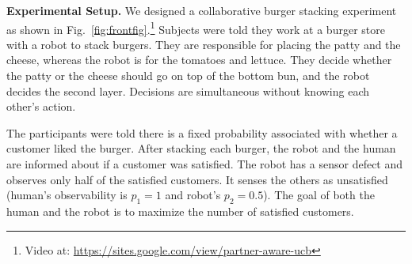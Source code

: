 \documentclass[letterpaper]{article} %
\theoremstyle{definition}
\begin{document}



\smallskip
\noindent\textbf{Experimental Setup.} We designed a collaborative burger stacking experiment as shown in Fig.~\ref{fig:frontfig}.\footnote{Video at: \url{https://sites.google.com/view/partner-aware-ucb}}
Subjects were told they work at a burger store with a robot to stack burgers. They are responsible for placing the patty and the cheese, whereas the robot is for the tomatoes and lettuce. They decide whether the patty or the cheese should go on top of the bottom bun, and the robot decides the second layer. Decisions are simultaneous without knowing each other's action.

The participants were told there is a fixed probability associated with whether a customer liked the burger. After stacking each burger, the robot and the human are informed about if a customer was satisfied. The robot has a sensor defect and observes only half of the satisfied customers. It senses the others as unsatisfied (human's observability is $p_1\!=\!1$ and robot's $p_2\!=\!0.5$). The goal of both the human and the robot is to maximize the number of satisfied customers.
\end{document}
